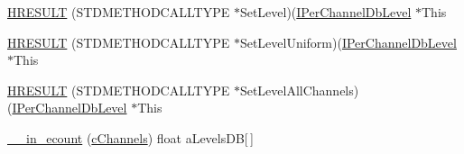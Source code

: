 \begin{DoxyCompactItemize}
\item 
\hyperlink{struct_i_per_channel_db_level_vtbl_a85f0c04608bd8e7f9e40fd1cce0f1e85}{H\+R\+E\+S\+U\+LT} (S\+T\+D\+M\+E\+T\+H\+O\+D\+C\+A\+L\+L\+T\+Y\+PE $\ast$Set\+Level)(\hyperlink{devicetopology_8h_a32fe99744d7ec8080119fb32ce0c72d6}{I\+Per\+Channel\+Db\+Level} $\ast$This
\item 
\hyperlink{struct_i_per_channel_db_level_vtbl_ad87716c7742eeebf6e271b2dd0589e2d}{H\+R\+E\+S\+U\+LT} (S\+T\+D\+M\+E\+T\+H\+O\+D\+C\+A\+L\+L\+T\+Y\+PE $\ast$Set\+Level\+Uniform)(\hyperlink{devicetopology_8h_a32fe99744d7ec8080119fb32ce0c72d6}{I\+Per\+Channel\+Db\+Level} $\ast$This
\item 
\hyperlink{struct_i_per_channel_db_level_vtbl_a80f8029c8ca12d8adc6fd11aa18fb31a}{H\+R\+E\+S\+U\+LT} (S\+T\+D\+M\+E\+T\+H\+O\+D\+C\+A\+L\+L\+T\+Y\+PE $\ast$Set\+Level\+All\+Channels)(\hyperlink{devicetopology_8h_a32fe99744d7ec8080119fb32ce0c72d6}{I\+Per\+Channel\+Db\+Level} $\ast$This
\item 
\hyperlink{struct_i_per_channel_db_level_vtbl_a9159ecedb638b8baac4c5c88144e4f83}{\+\_\+\+\_\+in\+\_\+ecount} (\hyperlink{struct_i_per_channel_db_level_vtbl_abd4bea7c51e69f5dafa135abea6b4895}{c\+Channels}) float a\+Levels\+DB\mbox{[}$\,$\mbox{]}
\end{DoxyCompactItemize}
